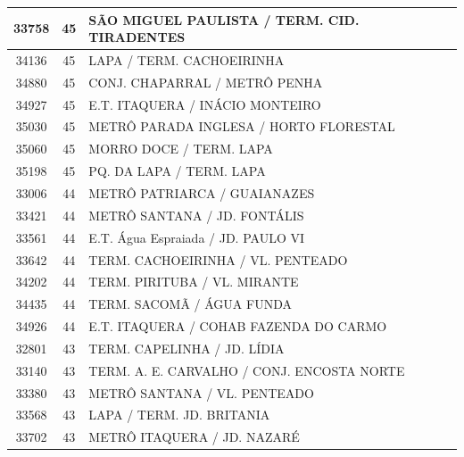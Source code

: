 \documentclass[
	12pt,				%
	oneside,			%
	a4paper,			%
	english,			%
	brazil				%
	]{abntex2ppgsi}
\begin{document}
{{\begin{apendicesenv}
\begin{longtable}{c|c|p{7cm}}
    33758 & 45    & SÃO MIGUEL PAULISTA / TERM. CID. TIRADENTES \\
\hline

    34136 & 45    & LAPA / TERM. CACHOEIRINHA \\
\hline

    34880 & 45    & CONJ. CHAPARRAL / METRÔ PENHA \\
\hline

    34927 & 45    & E.T. ITAQUERA / INÁCIO MONTEIRO \\
\hline

    35030 & 45    & METRÔ PARADA INGLESA / HORTO FLORESTAL \\
\hline

    35060 & 45    & MORRO DOCE / TERM. LAPA \\
\hline

    35198 & 45    & PQ. DA LAPA / TERM. LAPA \\
\hline

    33006 & 44    & METRÔ PATRIARCA / GUAIANAZES \\
\hline

    33421 & 44    & METRÔ SANTANA / JD. FONTÁLIS \\
\hline

    33561 & 44    & E.T. Água Espraiada / JD. PAULO VI \\
\hline

    33642 & 44    & TERM. CACHOEIRINHA / VL. PENTEADO \\
\hline

    34202 & 44    & TERM. PIRITUBA / VL. MIRANTE \\
\hline

    34435 & 44    & TERM. SACOMÃ / ÁGUA FUNDA \\
\hline

    34926 & 44    & E.T. ITAQUERA / COHAB FAZENDA DO CARMO \\
\hline

    32801 & 43    & TERM. CAPELINHA / JD. LÍDIA \\
\hline

    33140 & 43    & TERM. A. E. CARVALHO / CONJ. ENCOSTA NORTE \\
\hline

    33380 & 43    & METRÔ SANTANA / VL. PENTEADO \\
\hline

    33568 & 43    & LAPA / TERM. JD. BRITANIA \\
\hline

    33702 & 43    & METRÔ ITAQUERA / JD. NAZARÉ \\
\hline


\end{longtable}
\end{apendicesenv}}}
\end{document}
